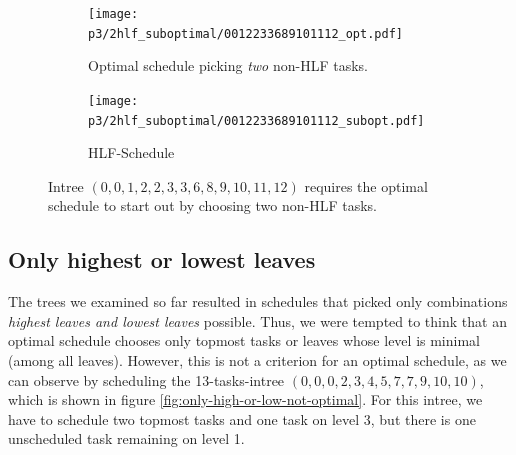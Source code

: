 \begin{figure}[ht]
  \centering
  \begin{subfigure}{.40\textwidth}
    \centering
    \texttt{[image: p3/2hlf\_suboptimal/0012233689101112\_opt.pdf]}
    \caption{Optimal schedule picking \emph{two} non-HLF tasks.}
  \end{subfigure}
  \begin{subfigure}{.58\textwidth}
    \centering
    \texttt{[image: p3/2hlf\_suboptimal/0012233689101112\_subopt.pdf]}
    \caption{HLF-Schedule}
  \end{subfigure}
  \caption{Intree $(0,0,1,2,2,3,3,6,8,9,10,11,12)$ requires the optimal schedule to start out by choosing two non-HLF tasks.}
  \label{fig:2-hlf-plus-one-not-optimal}
\end{figure}

\subsection{Only highest or lowest leaves}
\label{sec:disproving-only-highest-or-lowest-leaves}

The trees we examined so far resulted in schedules that picked only combinations \emph{highest leaves and lowest leaves} possible. Thus, we were tempted to think that an optimal schedule chooses only topmost tasks or leaves whose level is minimal (among all leaves). However, this is not a criterion for an optimal schedule, as we can observe by scheduling the 13-tasks-intree $(0,0,0,2,3,4,5,7,7,9,10,10)$, which is shown in figure \ref{fig:only-high-or-low-not-optimal}. For this intree, we have to schedule two topmost tasks and one task on level 3, but there is one unscheduled task remaining on level 1.

